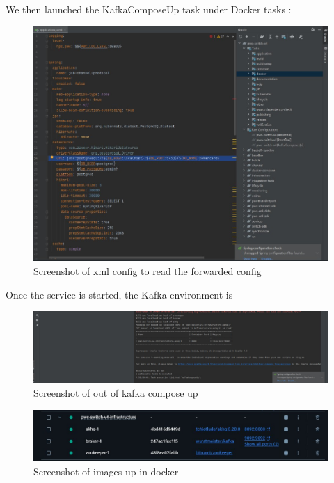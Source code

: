 \documentclass[12pt,a4paper]{report}
\begin{document}
We then launched the KafkaComposeUp task under Docker tasks :

\begin{figure}[H]
\centering
\includegraphics[width=\textwidth,height=\textheight,keepaspectratio]{media/image69.jpeg}
\caption{Screenshot of xml config to read the forwarded config}
\label{fig:XCRFC}
\end{figure} 

Once the service is started, the Kafka environment is
\begin{figure}[H]
\centering
\includegraphics[width=\textwidth,height=\textheight,keepaspectratio]{media/image70.jpeg}
\caption{Screenshot of out of kafka compose up}
\label{fig:XCRFC}
\end{figure} 



\begin{figure}[H]
\centering
\includegraphics[width=\textwidth,height=\textheight,keepaspectratio]{media/image71.jpeg}
\caption{Screenshot of images up in docker}
\label{fig:OFDP}
\end{figure} 
\end{document}
